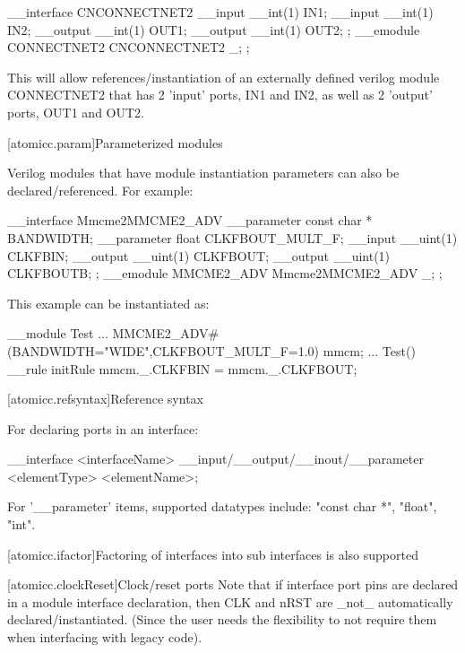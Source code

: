 \begin{codeblock}
     __interface CNCONNECTNET2 {
         __input  __int(1)         IN1;
         __input  __int(1)         IN2;
         __output __int(1)         OUT1;
         __output __int(1)         OUT2;
     };
     __emodule CONNECTNET2 {
         CNCONNECTNET2 _;
     };
\end{codeblock}

This will allow references/instantiation of an externally defined verilog module CONNECTNET2
that has 2 'input' ports, IN1 and IN2, as well as 2 'output' ports, OUT1 and OUT2.

[atomicc.param]{Parameterized modules}

Verilog modules that have module instantiation parameters can also be declared/referenced.
For example:

\begin{codeblock}
     __interface Mmcme2MMCME2_ADV {
         __parameter const char *  BANDWIDTH;
         __parameter float         CLKFBOUT_MULT_F;
         __input  __uint(1)        CLKFBIN;
         __output __uint(1)        CLKFBOUT;
         __output __uint(1)        CLKFBOUTB;
     };
     __emodule MMCME2_ADV {
         Mmcme2MMCME2_ADV _;
     };
\end{codeblock}

This example can be instantiated as:

\begin{codeblock}
     __module Test {
         ...
         MMCME2_ADV#(BANDWIDTH="WIDE",CLKFBOUT_MULT_F=1.0) mmcm;
         ...
         Test() {
            __rule initRule {
                mmcm._.CLKFBIN = mmcm._.CLKFBOUT;
            }
         }
     }
\end{codeblock}

[atomicc.refsyntax]{Reference syntax}

For declaring ports in an interface:
\begin{codeblock}
     __interface <interfaceName> {
          __input/__output/__inout/__parameter <elementType> <elementName>;
     }
\end{codeblock}
For '__parameter' items, supported datatypes include: "const char *", "float", "int".

[atomicc.ifactor]{Factoring of interfaces into sub interfaces is also supported}

[atomicc.clockReset]{Clock/reset ports}
Note that if interface port pins are declared in a module interface declaration, then
CLK and nRST are _not_ automatically declared/instantiated.  (Since the user needs the
flexibility to not require them when interfacing with legacy code).

